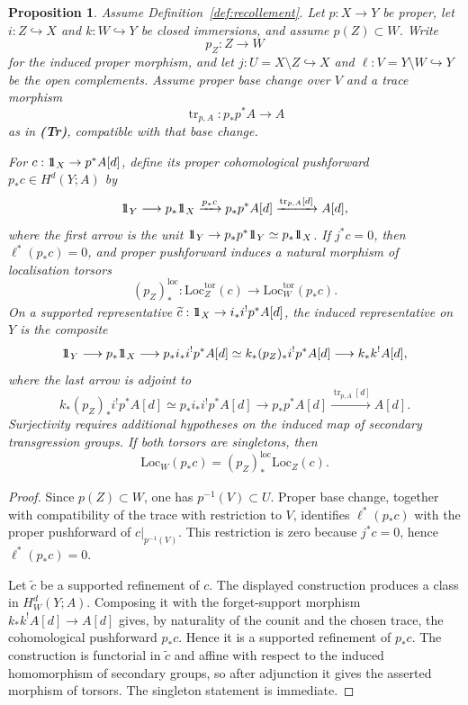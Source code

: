\documentclass[10pt,a4paper,dvipsnames,x11names]{amsart}
\newcommand{\one}{1\hskip-3.5pt1}
\newcommand{\Loc}{\mathrm{Loc}}
\numberwithin{equation}{section}
\theoremstyle{plain}
\newtheorem{proposition}[proposition]{Proposition}
\theoremstyle{definition}
\theoremstyle{remark}
\begin{document}
\begin{proposition}\label{prop:Loc-proper}
Assume Definition~\ref{def:recollement}.  Let $p:X\to Y$ be proper, let $i:Z\hookrightarrow X$ and $k:W\hookrightarrow Y$ be closed immersions, and assume $p(Z)\subset W$.  Write
\[
p_Z:Z\longrightarrow W
\]
for the induced proper morphism, and let $j:U=X\setminus Z\hookrightarrow X$ and $\ell:V=Y\setminus W\hookrightarrow Y$ be the open complements.  Assume proper base change over $V$ and a trace morphism
\[
\operatorname{tr}_{p,A}:p_*p^*A\longrightarrow A
\]
as in \textbf{(Tr)}, compatible with that base change.

For $c:\one_X\to p^*A[d]$, define its proper cohomological pushforward $p_*c\in H^d(Y;A)$ by
\[
\one_Y\longrightarrow p_*\one_X\xrightarrow{p_*c}p_*p^*A[d]
\xrightarrow{\operatorname{tr}_{p,A}[d]}A[d],
\]
where the first arrow is the unit $\one_Y\to p_*p^*\one_Y\simeq p_*\one_X$.  If $j^*c=0$, then $\ell^*(p_*c)=0$, and proper pushforward induces a natural morphism of localisation torsors
\[
(p_Z)_*^{\mathrm{loc}}:
\Loc_Z^{\mathrm{tor}}(c)
\longrightarrow
\Loc_W^{\mathrm{tor}}(p_*c).
\]
On a supported representative $\widetilde c:\one_X\to i_*i^!p^*A[d]$, the induced representative on $Y$ is the composite
\[
\one_Y
\longrightarrow p_*\one_X
\longrightarrow p_*i_*i^!p^*A[d]
\simeq k_*(p_Z)_*i^!p^*A[d]
\longrightarrow k_*k^!A[d],
\]
where the last arrow is adjoint to
\[
k_*(p_Z)_*i^!p^*A[d]
\simeq p_*i_*i^!p^*A[d]
\longrightarrow p_*p^*A[d]
\xrightarrow{\operatorname{tr}_{p,A}[d]} A[d].
\]
Surjectivity requires additional hypotheses on the induced map of secondary transgression groups.  If both torsors are singletons, then
\[
\Loc_W(p_*c)=(p_Z)_*^{\mathrm{loc}}\Loc_Z(c).
\]
\end{proposition}

\begin{proof}
Since $p(Z)\subset W$, one has $p^{-1}(V)\subset U$.  Proper base change, together with compatibility of the trace with restriction to $V$, identifies $\ell^*(p_*c)$ with the proper pushforward of $c|_{p^{-1}(V)}$.  This restriction is zero because $j^*c=0$, hence $\ell^*(p_*c)=0$.

Let $\widetilde c$ be a supported refinement of $c$.  The displayed construction produces a class in $H_W^d(Y;A)$.  Composing it with the forget-support morphism $k_*k^!A[d]\to A[d]$ gives, by naturality of the counit and the chosen trace, the cohomological pushforward $p_*c$.  Hence it is a supported refinement of $p_*c$.  The construction is functorial in $\widetilde c$ and affine with respect to the induced homomorphism of secondary groups, so after adjunction it gives the asserted morphism of torsors.  The singleton statement is immediate.
\end{proof}
\end{document}
